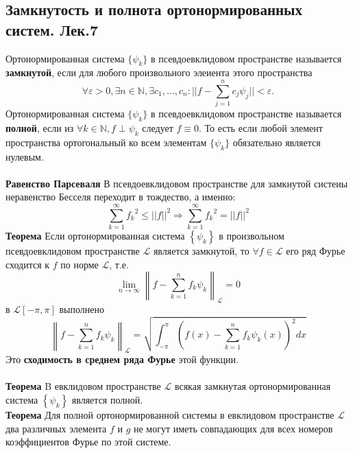 \documentclass{article}
\begin{document}
\subsection{Замкнутость и полнота ортонормированных систем. Лек.7}
	Ортонормированная система $\{{\psi}_{k}\}$ в псевдоевклидовом пространстве называется \textbf{замкнутой}, если для любого произвольного элеиента этого пространства 
	\begin{equation}
	\label{2-1}
	\forall \varepsilon>0,\exists n\in \mathbb{N},\exists {c}_{1},\ldots,{c}_{n}: ||f-\sum_{j=1}^{n} {c}_{j}{\psi}_{j}||<\varepsilon.
	\end{equation}
	Ортонормированная система $\{{\psi}_{k}\}$ в псевдоевклидовом пространстве называется \textbf{полной}, если из $\forall k\in \mathbb{N},f\perp{\psi}_{k}$ следует $f\equiv0$. То есть если любой элемент пространства ортогональный ко всем элементам $\{{\psi}_{k}\}$ обязательно является нулевым.\\
	\\
	\textbf{Равенство Парсеваля} В псевдоевклидовом пространстве для замкнутой систеиы неравенство Бесселя переходит в тождество, а именно:
	\begin{equation}
	\label{2-2}
	\sum_{k=1}^{\infty}{{f}_{k}}^{2}\le {||f||}^{2} \Rightarrow \sum_{k=1}^{\infty}{{f}_{k}}^{2}={||f||}^{2}
	\end{equation}
	\textbf{Теорема} Если ортонормированная система $\left\{\psi_{k}\right\} $ в произвольном псевдоевклидовом пространстве $ \mathcal{L} $ является замкнутой, то $ \forall f \in \mathcal{L} $ его ряд Фурье сходится к $ f $ по норме $\mathcal{L}$, т.е.
	\begin{equation}
	\label{2-3}
	\lim _{n \rightarrow \infty}\left\|f-\sum_{k=1}^{n} f_{k} \psi_{k}\right\|_{\mathcal{L}}=0
	\end{equation}
	в $\mathcal{L}[-\pi,\pi]$ выполнено
	\begin{equation}
	\label{2-4}
	\left\|f-\sum_{k=1}^{n} f_{k} \psi_{k}\right\|_{\mathcal{L}}=\sqrt{\int_{-\pi}^{\pi} {(f(x)-\sum_{k=1}^{n} {f}_{k}{\psi}_{k}(x))}^{2}dx}
	\end{equation}
	Это \textbf{сходимость в среднем ряда Фурье} этой функции.\\
	\\
	\textbf{Теорема} B евклидовом пространстве $ \mathcal{L} $ всякая замкнутая ортонормированная система $ \left\{\psi_{k}\right\} $ является полной.\\
	\textbf{Теорема} Для полной ортонормированной системы в евклидовом пространстве $ \mathcal{L} $ два различных элемента $ f $ и $ g $ не могут иметь совпадающих для всех номеров коэффициентов Фурье по этой системе.\\
	
\end{document}
